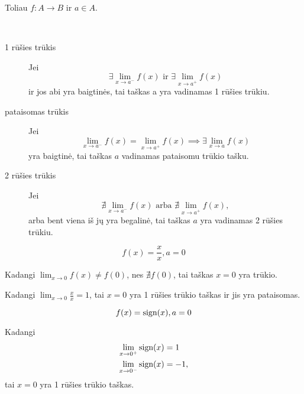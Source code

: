 \begin{note}
  Toliau $f: A \to B$ ir $a \in A$.
\end{note}

\begin{defn}
  \hfill \\
  \begin{description}
    \item[1 rūšies trūkis] Jei 
      \begin{equation*}
        \exists \lim _{x \to a^{-}} f(x) 
        \text{ ir }
        \exists \lim _{x \to a^{+}} f(x) 
      \end{equation*}
       ir jos abi yra baigtinės, tai
      taškas a yra vadinamas 1 rūšies trūkiu.
    \item[pataisomas trūkis] Jei
      \begin{equation*}
        \lim _{x \to a^{-}} f(x) = \lim _{x \to a^{+}} f(x) 
        \implies \exists \lim _{x \to a} f(x)
      \end{equation*}
      yra baigtinė, tai taškas $a$ vadinamas pataisomu trūkio tašku.
    \item[2 rūšies trūkis] Jei
      \begin{equation*}
        \nexists \lim _{x \to a^{-}} f(x)
        \text{ arba }
        \nexists \lim _{x \to a^{+}} f(x),
      \end{equation*}
      arba bent viena iš jų yra begalinė, tai taškas $a$ yra vadinamas
      2 rūšies trūkiu.
  \end{description}
\end{defn}

\begin{exmp}
  \begin{equation*}
    f(x) = \frac{x}{x}, a = 0
  \end{equation*}

  Kadangi $\lim _{x \to 0} f(x) \neq f(0)$, nes $\nexists f(0)$, tai
  taškas $x = 0$ yra trūkio.

  Kadangi $\lim _{x \to 0} \frac{x}{x} = 1$, tai $x = 0$ yra 1 rūšies
  trūkio taškas ir jis yra pataisomas.
\end{exmp}

\begin{exmp}
  \begin{equation*}
    f(x) = \mathop{\text{sign}}(x), a = 0
  \end{equation*}

  Kadangi
  \begin{align*}
    \lim _{x \to 0^{+}} \mathop{\text{sign}}(x) &= 1 \\
    \lim _{x \to 0^{-}} \mathop{\text{sign}}(x) &= -1,
  \end{align*}
  tai $x = 0$ yra 1 rūšies trūkio taškas.
\end{exmp}

